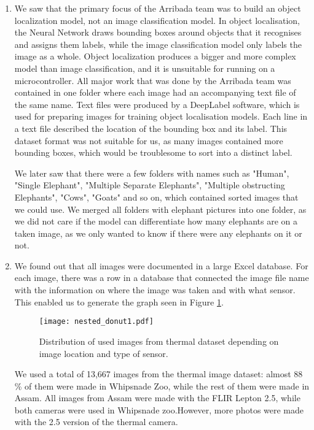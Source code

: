\begin{enumerate}
    \item We saw that the primary focus of the Arribada team was to build an object localization model, not an image classification model.
In object localisation, the Neural Network draws bounding boxes around objects that it recognises and assigns them labels, while the image classification model only labels the image as a whole.
Object localization produces a bigger and more complex model than image classification, and it is unsuitable for running on a microcontroller.
All major work that was done by the Arribada team was contained in one folder where each image had an accompanying text file of the same name.
Text files were produced by a DeepLabel software, which is used for preparing images for training object localisation models.
Each line in a text file described the location of the bounding box and its label.
This dataset format was not suitable for us, as many images contained more bounding boxes, which would be troublesome to sort into a distinct label.

We later saw that there were a few folders with names such as "Human", "Single Elephant", "Multiple Separate Elephants", "Multiple obstructing Elephants", "Cows", "Goats" and so on, which contained sorted images that we could use.
We merged all folders with elephant pictures into one folder, as we did not care if the model can differentiate how many elephants are on a taken image, as we only wanted to know if there were any elephants on it or not.

    \item We found out that all images were documented in a large Excel database.
For each image, there was a row in a database that connected the image file name with the information on where the image was taken and with what sensor.
This enabled us to generate the graph seen in Figure \ref{nested_donut1}.

\begin{figure}[ht]
    \centering
    \texttt{[image: nested\_donut1.pdf]} 
    \caption{Distribution of used images from thermal dataset depending on image location and type of sensor.}
    \label{nested_donut1}
\end{figure}

We used a total of 13,667 images from the thermal image dataset: almost 88 \% of them were made in Whipsnade Zoo, while the rest of them were made in Assam.
All images from Assam were made with the FLIR Lepton 2.5, while both cameras were used in Whipsnade zoo.However, more photos were made with the 2.5 version of the thermal camera.


\end{enumerate}
